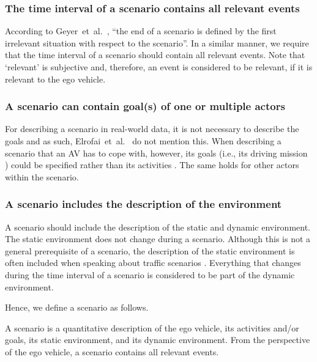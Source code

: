 \subsubsection{The time interval of a scenario contains all relevant events}
According to Geyer~et~al.~\cite{geyer2014}, ``the end of a scenario is defined by the first irrelevant situation with respect to the scenario''. In a similar manner, we require that the time interval of a scenario should contain all relevant events. Note that `relevant' is subjective and, therefore, an event is considered to be relevant, if it is relevant to the ego vehicle.

\subsubsection{A scenario can contain goal(s) of one or multiple actors}
For describing a scenario in real-world data, it is not necessary to describe the goals and as such, Elrofai~et~al.~\cite{elrofai2016scenario} do not mention this. When describing a scenario that an AV has to cope with, however, its goals (i.e., its driving mission \cite{geyer2014}) could be specified rather than its activities \cite{ulbrich2015}. The same holds for other actors within the scenario.
	
\subsubsection{A scenario includes the description of the environment}
A scenario should include the description of the static and dynamic environment. The static environment does not change during a scenario. Although this is not a general prerequisite of a scenario, the description of the static environment is often included when speaking about traffic scenarios \cite{geyer2014, ulbrich2015, elrofai2016scenario, ebner2011identifying, schuldt2013effiziente, althoff2017CommonRoad}. Everything that changes during the time interval of a scenario is considered to be part of the dynamic environment. 

Hence, we define a scenario as follows.
\begin{definition}[Scenario]\label{def:scenario}
	A scenario is a quantitative description of the ego vehicle, its activities and/or goals, its static environment, and its dynamic environment. From the perspective of the ego vehicle, a scenario contains all relevant events.
\end{definition}

